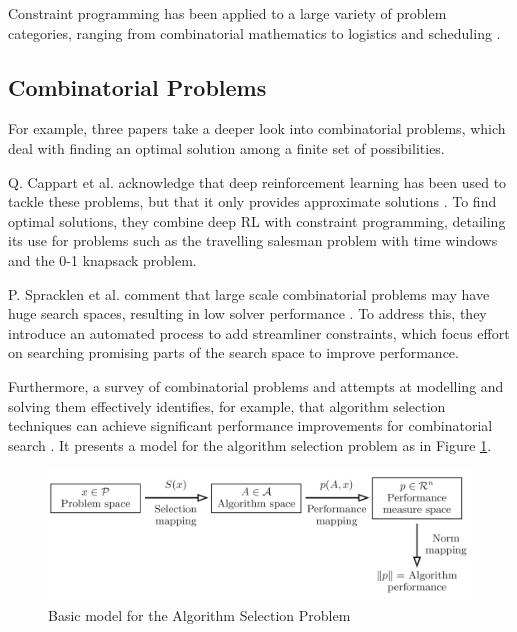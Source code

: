 Constraint programming has been applied to a large variety of problem categories, ranging from combinatorial mathematics to logistics and scheduling \cite{CSPLib}.

\subsection{Combinatorial Problems}
For example, three papers take a deeper look into combinatorial problems, which deal with finding an optimal solution among a finite set of possibilities.

Q. Cappart et al. acknowledge that deep reinforcement learning has been used to tackle these problems, but that it only provides approximate solutions \cite{Combinatorics_CP_RL}. To find optimal solutions, they combine deep RL with constraint programming, detailing its use for problems such as the travelling salesman problem with time windows and the 0-1 knapsack problem.

P. Spracklen et al. comment that large scale combinatorial problems may have huge search spaces, resulting in low solver performance \cite{Combinatorics_Streamliner_Constraints}. To address this, they introduce an automated process to add streamliner constraints, which focus effort on searching promising parts of the search space to improve performance.

Furthermore, a survey of combinatorial problems and attempts at modelling and solving them effectively identifies, for example, that algorithm selection techniques can achieve significant performance improvements for combinatorial search \cite{Data_Mining_and_Constraint_Programming}. It presents a model for the algorithm selection problem as in Figure \ref{fig:algorithmSelection}.

\begin{figure}[H]
    \centering
    \includegraphics[width=\textwidth, height=0.3\textheight, keepaspectratio]{Images/AlgorithmSelection.png}
    \caption{Basic model for the Algorithm Selection Problem \cite{Data_Mining_and_Constraint_Programming}}
    \label{fig:algorithmSelection}
\end{figure}

